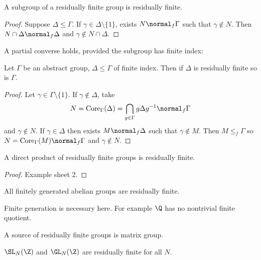 \documentclass[a4paper]{article}
\begin{document}
\begin{proposition}
  A subgroup of a residually finite group is residually finite.
\end{proposition}

\begin{proof}
  Suppose \(\Delta \leq \Gamma\). If \(\gamma \in \Delta \setminus \{1\}\), exists \(N \normal_f \Gamma\) such that \(\gamma \notin N\). Then \(N \cap \Delta \normal_f \Delta\) and \(\gamma \notin N \cap \Delta\).
\end{proof}

A partial converse holds, provided the subgroup has finite index:

\begin{proposition}
  Let \(\Gamma\) be an abstract group, \(\Delta \leq \Gamma\) of finite index. Then if \(\Delta\) is residually finite so is \(\Gamma\).
\end{proposition}

\begin{proof}
  Let \(\gamma \in \Gamma \setminus \{1\}\). If \(\gamma \notin \Delta\), take
  \[
    N = \mathrm{Core}_\Gamma(\Delta) = \bigcap_{g \in \Gamma} g\Delta g^{-1} \normal_f \Gamma
  \]
  and \(\gamma \notin N\). If \(\gamma \in \Delta\) then exists \(M \normal_f \Delta\) such that \(\gamma \notin M\). Then \(M \leq_f \Gamma\) so \(N = \mathrm{Core}_\Gamma(M) \normal_f \Gamma\) and \(\gamma \notin N\).
\end{proof}

\begin{proposition}
  A direct product of residually finite groups is residually finite.
\end{proposition}

\begin{proof}
  Example sheet 2.
\end{proof}

\begin{proposition}
  All finitely generated abelian groups are residually finite.
\end{proposition}

\begin{remark}
  Finite generation is necessary here. For example \(\Q\) has no nontrivial finite quotient.
\end{remark}

A source of residually finite groups is matrix group.

\begin{proposition}
  \(\SL_N(\Z)\) and \(\GL_N(\Z)\) are residually finite for all \(N\).
\end{proposition}
\end{document}
